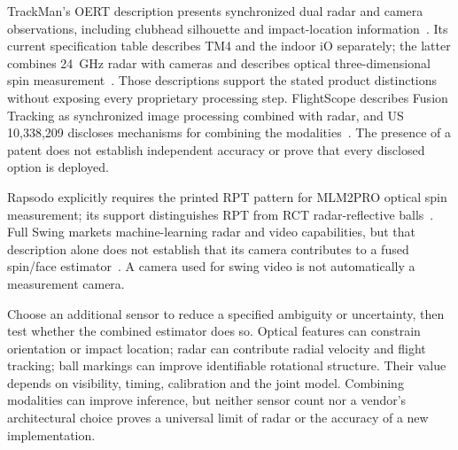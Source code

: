 TrackMan's OERT description presents synchronized dual radar and camera observations, including clubhead silhouette and impact-location information~\cite{trackmanoert}.
Its current specification table describes TM4 and the indoor iO separately; the latter combines \SI{24}{\giga\hertz} radar with cameras and describes optical three-dimensional spin measurement~\cite{trackmanspecs}.
Those descriptions support the stated product distinctions without exposing every proprietary processing step.
FlightScope describes Fusion Tracking as synchronized image processing combined with radar, and US\,10,338,209 discloses mechanisms for combining the modalities~\cite{flightscopex3csetup,us10338209}.
The presence of a patent does not establish independent accuracy or prove that every disclosed option is deployed.

Rapsodo explicitly requires the printed RPT pattern for MLM2PRO optical spin measurement; its support distinguishes RPT from RCT radar-reflective balls~\cite{rapsodomlm2prorpt}.
Full Swing markets machine-learning radar and video capabilities, but that description alone does not establish that its camera contributes to a fused spin/face estimator~\cite{fullswingkit}.
A camera used for swing video is not automatically a measurement camera.

\begin{implication}
Choose an additional sensor to reduce a specified ambiguity or uncertainty, then test whether the combined estimator does so.
Optical features can constrain orientation or impact location; radar can contribute radial velocity and flight tracking; ball markings can improve identifiable rotational structure.
Their value depends on visibility, timing, calibration and the joint model.
Combining modalities can improve inference, but neither sensor count nor a vendor's architectural choice proves a universal limit of radar or the accuracy of a new implementation.
\end{implication}
